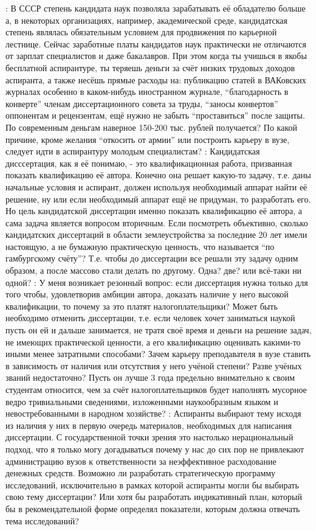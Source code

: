 \begin{drama}
	\maxspeaks: В СССР степень кандидата наук позволяла зарабатывать её обладателю больше а, в некоторых организациях, например, академической среде, кандидатская степень являлась обязательным условием для продвижения по карьерной лестнице. Сейчас заработные платы кандидатов наук практически не отличаются от зарплат специалистов и даже бакалавров. При этом когда ты учишься в якобы бесплатной аспирантуре, ты теряешь деньги за счёт низких трудовых доходов аспиранта, а также несёшь прямые расходы на: публикацию статей в ВАКовских журналах особенно в каком-нибудь иностранном журнале, “благодарность в конверте” членам диссертационного совета за труды, “заносы конвертов” оппонентам и рецензентам, ещё нужно не забыть “проставиться” после защиты. По современным деньгам наверное 150-200 тыс. рублей получается? По какой причине, кроме желания “откосить от армии” или построить карьеру в вузе, следует идти в аспирантуру молодым специалистам?
	\maxspeaks: Кандидатская дисссертация, как я её понимаю, - это квалификационная работа, призванная показать квалификацию её автора. Конечно она решает какую-то задачу, т.е. даны начальные условия и аспирант, должен используя необходимый аппарат найти её решение, ну или если необходимый аппарат ещё не придуман, то разработать его. Но цель кандидатской диссертации именно показать квалификацию её автора, а сама задача является вопросом вторичным. Если посмотреть объективно, сколько кандидатских диссертаций в области землеустройства за последние 20 лет имели настоящую, а не бумажную практическую ценность, что называется “по гамбургскому счёту”? Т.е. чтобы до диссертации все решали эту задачу одним образом, а после массово стали делать по другому. Одна? две? или всё-таки ни одной? 
	\maxspeaks: У меня возникает резонный вопрос: если диссертация нужна только для того чтобы, удовлетворив амбиции автора, доказать наличие у него высокой квалификации, то почему за это платят налогоплательщики? Может быть необходимо отменить диссертации, т.е. если человек хочет заниматься наукой пусть он ей и дальше занимается, не тратя своё время и деньги на решение задач, не имеющих практической ценности, а его квалификацию оценивать какими-то иными менее затратными способами? Зачем карьеру преподавателя в вузе ставить в зависимость от наличия или отсутствия у него учёной степени? Разве учёных званий недостаточно? Пусть он лучше 3 года предельно внимательно к своим студентам относится, чем за счёт налогоплательщиков будет наполнять  мусорное ведро тривиальными сведениями, изложенными наукообразным языком и невостребованными в народном хозяйстве?
	\maxspeaks: Аспиранты выбирают тему исходя из наличия у них в первую очередь материалов, необходимых для написания диссертации. С государственной точки зрения это настолько нерациональный подход, что я только могу догадываться почему у нас до сих пор не привлекают администрацию вузов к ответственности за неэффективное расходование денежных средств. Возможно ли разработать стратегическую программу исследований, исключительно в рамках которой аспиранты могли бы выбирать свою тему диссертации? Или хотя бы разработать индикативный план, который бы в рекомендательной форме определял показатели, которым должна отвечать тема исследований?

\end{drama}
